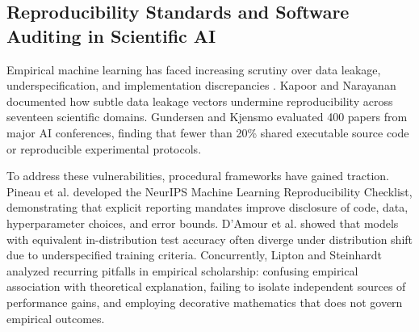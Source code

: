 \subsection{Reproducibility Standards and Software Auditing in Scientific AI}
Empirical machine learning has faced increasing scrutiny over data leakage, underspecification, and implementation discrepancies \cite{damour2022,gundersen2018,kapoor2023,lipton2019}. Kapoor and Narayanan \cite{kapoor2023} documented how subtle data leakage vectors undermine reproducibility across seventeen scientific domains. Gundersen and Kjensmo \cite{gundersen2018} evaluated 400 papers from major AI conferences, finding that fewer than 20\% shared executable source code or reproducible experimental protocols.

To address these vulnerabilities, procedural frameworks have gained traction. Pineau et al. \cite{pineau2021} developed the NeurIPS Machine Learning Reproducibility Checklist, demonstrating that explicit reporting mandates improve disclosure of code, data, hyperparameter choices, and error bounds. D'Amour et al. \cite{damour2022} showed that models with equivalent in-distribution test accuracy often diverge under distribution shift due to underspecified training criteria. Concurrently, Lipton and Steinhardt \cite{lipton2019} analyzed recurring pitfalls in empirical scholarship: confusing empirical association with theoretical explanation, failing to isolate independent sources of performance gains, and employing decorative mathematics that does not govern empirical outcomes.

